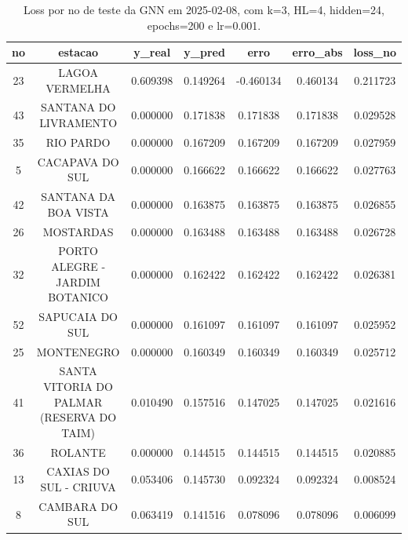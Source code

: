 \begin{table}[h]
\centering
\caption{Loss por no de teste da GNN em 2025-02-08, com k=3, HL=4, hidden=24, epochs=200 e lr=0.001.}
\label{tab:gnn_loss_k3_hl4_h24_e200_d20250208}
\begin{tabular}{ccccccc}
\toprule
no & estacao & y\_real & y\_pred & erro & erro\_abs & loss\_no \\
\midrule
23 & LAGOA VERMELHA & 0.609398 & 0.149264 & -0.460134 & 0.460134 & 0.211723 \\
43 & SANTANA DO LIVRAMENTO & 0.000000 & 0.171838 & 0.171838 & 0.171838 & 0.029528 \\
35 & RIO PARDO & 0.000000 & 0.167209 & 0.167209 & 0.167209 & 0.027959 \\
5 & CACAPAVA DO SUL & 0.000000 & 0.166622 & 0.166622 & 0.166622 & 0.027763 \\
42 & SANTANA DA BOA VISTA & 0.000000 & 0.163875 & 0.163875 & 0.163875 & 0.026855 \\
26 & MOSTARDAS & 0.000000 & 0.163488 & 0.163488 & 0.163488 & 0.026728 \\
32 & PORTO ALEGRE - JARDIM BOTANICO & 0.000000 & 0.162422 & 0.162422 & 0.162422 & 0.026381 \\
52 & SAPUCAIA DO SUL & 0.000000 & 0.161097 & 0.161097 & 0.161097 & 0.025952 \\
25 & MONTENEGRO & 0.000000 & 0.160349 & 0.160349 & 0.160349 & 0.025712 \\
41 & SANTA VITORIA DO PALMAR (RESERVA DO TAIM) & 0.010490 & 0.157516 & 0.147025 & 0.147025 & 0.021616 \\
36 & ROLANTE & 0.000000 & 0.144515 & 0.144515 & 0.144515 & 0.020885 \\
13 & CAXIAS DO SUL - CRIUVA & 0.053406 & 0.145730 & 0.092324 & 0.092324 & 0.008524 \\
8 & CAMBARA DO SUL & 0.063419 & 0.141516 & 0.078096 & 0.078096 & 0.006099 \\
\bottomrule
\end{tabular}
\end{table}

